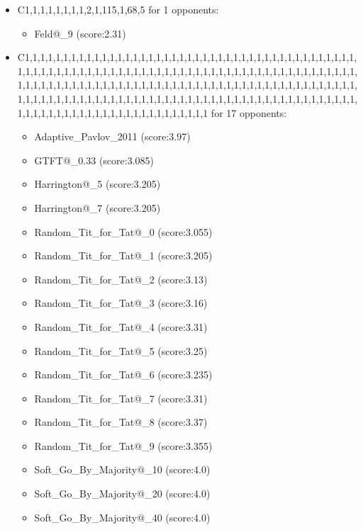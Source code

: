 \begin{appendices}
\begin{itemize}
        \item C1,1,1,1,1,1,1,1,2,1,115,1,68,5 for 1 opponents:
        \begin{multicols}{3}
            \begin{itemize}
                \item Feld@\_9 (score:2.31)
            \end{itemize}
        \end{multicols}

        \item C1,1,1,1,1,1,1,1,1,1,1,1,1,1,1,1,1,1,1,1,1,1,1,1,1,1,1,1,1,1,1,1,1,1,1,1,1,1,1,1,1,1,1,1,1,1,1,1,1,1,1,1,1,1,1,1,1,1,1,1,1,1,1,1,1,1,1,1,1,1,1,1,1,1,1,1,1,1,1,1,1,1,1,1,1,1,1,1,1,1,1,1,1,1,1,1,1,1,1,1,1,1,1,1,1,1,1,1,1,1,1,1,1,1,1,1,1,1,1,1,1,1,1,1,1,1,1,1,1,1,1,1,1,1,1,1,1,1,1,1,1,1,1,1,1,1,1,1,1,1,1,1,1,1,1,1,1,1,1,1,1,1,1,1,1,1,1,1,1,1,1,1,1,1,1,1,1,1,1,1,1,1,1,1,1,1,1,1,1,1,1,1,1,1,1,1,1,1,1,1 for 17 opponents:
        \begin{multicols}{3}
            \begin{itemize}
                \item Adaptive\_Pavlov\_2011 (score:3.97)
                \item GTFT@\_0.33 (score:3.085)
                \item Harrington@\_5 (score:3.205)
                \item Harrington@\_7 (score:3.205)
                \item Random\_Tit\_for\_Tat@\_0 (score:3.055)
                \item Random\_Tit\_for\_Tat@\_1 (score:3.205)
                \item Random\_Tit\_for\_Tat@\_2 (score:3.13)
                \item Random\_Tit\_for\_Tat@\_3 (score:3.16)
                \item Random\_Tit\_for\_Tat@\_4 (score:3.31)
                \item Random\_Tit\_for\_Tat@\_5 (score:3.25)
                \item Random\_Tit\_for\_Tat@\_6 (score:3.235)
                \item Random\_Tit\_for\_Tat@\_7 (score:3.31)
                \item Random\_Tit\_for\_Tat@\_8 (score:3.37)
                \item Random\_Tit\_for\_Tat@\_9 (score:3.355)
                \item Soft\_Go\_By\_Majority@\_10 (score:4.0)
                \item Soft\_Go\_By\_Majority@\_20 (score:4.0)
                \item Soft\_Go\_By\_Majority@\_40 (score:4.0)
            \end{itemize}
        \end{multicols}


\end{itemize}
\end{appendices}
